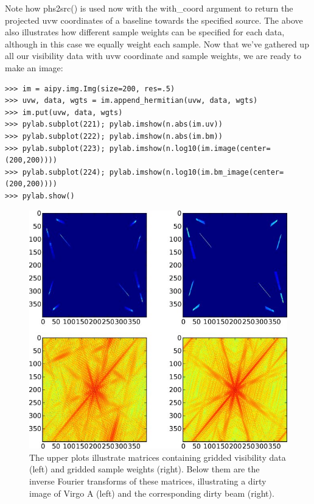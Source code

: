Note how phs2src() is used now with the with\_coord argument to return the
projected uvw coordinates of a baseline towards the specified source.  The
above also illustrates how different sample weights can be specified for each
data, although in this case we equally weight each sample.  Now that we've
gathered up all our visibility data with uvw coordinate and sample weights,
we are ready to make an image:

\begin{verbatim}
>>> im = aipy.img.Img(size=200, res=.5)
>>> uvw, data, wgts = im.append_hermitian(uvw, data, wgts)
>>> im.put(uvw, data, wgts)
>>> pylab.subplot(221); pylab.imshow(n.abs(im.uv))
>>> pylab.subplot(222); pylab.imshow(n.abs(im.bm))
>>> pylab.subplot(223); pylab.imshow(n.log10(im.image(center=(200,200))))
>>> pylab.subplot(224); pylab.imshow(n.log10(im.bm_image(center=(200,200))))
>>> pylab.show()
\end{verbatim}

\begin{figure}
\begin{center}
\includegraphics[scale=.4]{img_vir.jpg}
\caption{The upper plots illustrate matrices containing gridded visibility
data (left) and gridded sample weights (right).  Below them are the inverse
Fourier transforms of these matrices, illustrating a dirty image of Virgo A
(left) and the corresponding dirty beam (right).}
\label{fig:img_vir}
\end{center}
\end{figure}

